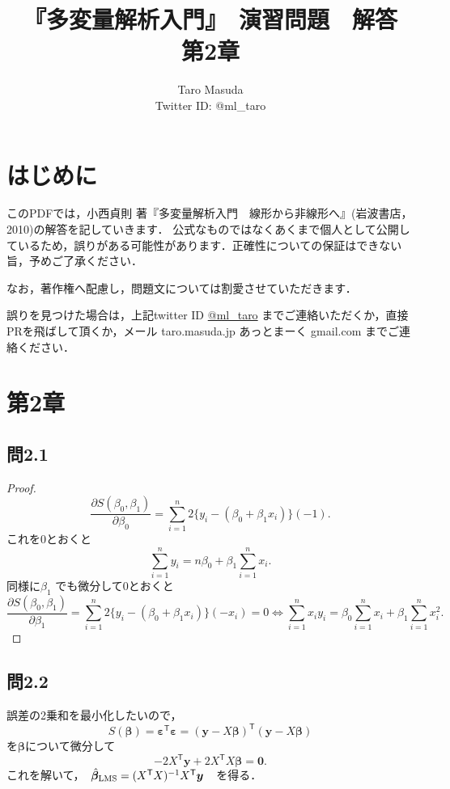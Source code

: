 \documentclass[pdflatex,ja=standard]{bxjsarticle}
\title{『多変量解析入門』　演習問題　解答　第2章}
\author{Taro Masuda \\ Twitter ID: @ml\_taro}
\begin{document}
\maketitle

\section{はじめに}
このPDFでは，小西貞則 著『多変量解析入門　線形から非線形へ』(岩波書店，2010)の解答を記していきます．
公式なものではなくあくまで個人として公開しているため，誤りがある可能性があります．正確性についての保証はできない旨，予めご了承ください．

なお，著作権へ配慮し，問題文については割愛させていただきます．

誤りを見つけた場合は，上記twitter ID \href{https://twitter.com/ml_taro}{@ml\_taro} までご連絡いただくか，直接PRを飛ばして頂くか，メール taro.masuda.jp あっとまーく gmail.com までご連絡ください．

\section{第2章}

\subsection{問2.1}

\begin{proof}
\begin{equation}
\frac{\partial S(\beta_{0}, \beta_{1})}{\partial \beta_{0}} =  \sum_{i=1}^{n} 2 \{ y_i - ( \beta_0 + \beta_1 x_i )  \}  (-1) .
\end{equation}
これを0とおくと
\begin{equation}
\sum_{i=1}^{n} y_i = n \beta_0 + \beta_1 \sum_{i=1}^{n} x_i. 
\end{equation}
同様に$\beta_1$ でも微分して0とおくと
\begin{equation}
\frac{\partial S(\beta_{0}, \beta_{1})}{\partial \beta_{1}} =  \sum_{i=1}^{n} 2 \{ y_i - ( \beta_0 + \beta_1 x_i )  \} (-x_i) = 0
\iff \sum_{i=1}^{n} x_i y_i =  \beta_0 \sum_{i=1}^{n} x_i + \beta_1 \sum_{i=1}^{n} x_i^2.
\end{equation}
\end{proof}

\subsection{問2.2}
誤差の2乗和を最小化したいので，
\begin{equation}
S(\bm{\beta}) = \bm{\varepsilon}^{\mathsf{T}} \bm{\varepsilon} = (\bm{y} - X \bm{\beta})^{\mathsf{T}} (\bm{y} - X \bm{\beta})
\end{equation}
を$\bm{\beta}$について微分して
\begin{equation}
- 2 X^{\mathsf{T}} \bm{y} + 2 X^{\mathsf{T}}X \bm{\beta} = \bm{0}. 
\end{equation}
これを解いて，　$\hat{\bm{\beta}}_{\rm{LMS}} = (X^{\mathsf{T}} X)^{-1} X^{\mathsf{T}} \bm{y}$　を得る．
\end{document}

